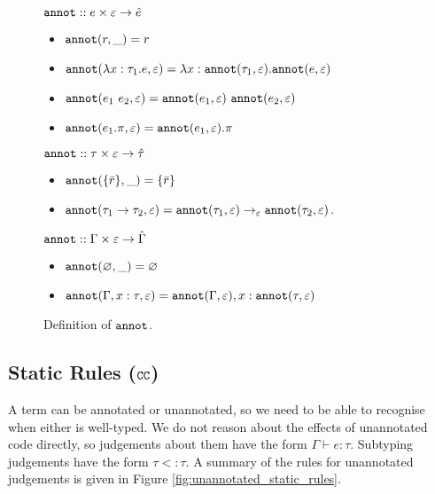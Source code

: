\begin{figure}
\vspace{-0.2cm}

$\mathtt{annot} :: e \times \varepsilon \rightarrow \hat e$

\begin{itemize}
	\setlength\itemsep{-0.2em}
	\item[] $\mathtt{annot}(r, \_) = r$
	\item[] $\mathtt{annot}(\lambda x: \tau_1 . e, \varepsilon) = \lambda x: \mathtt{annot}(\tau_1, \varepsilon) . \mathtt{annot}(e, \varepsilon)$
	\item[] $\mathtt{annot}(e_1~e_2, \varepsilon) = \mathtt{annot}(e_1, \varepsilon)~\mathtt{annot}(e_2, \varepsilon)$
	\item[] $\mathtt{annot}(e_1.\pi, \varepsilon) = \mathtt{annot}(e_1, \varepsilon).\pi$
\end{itemize}
	
$\mathtt{annot} :: \tau \times \varepsilon \rightarrow \hat \tau$

\begin{itemize}
	\setlength\itemsep{-0.2em}
	\item[] $\mathtt{annot}(\{ \bar r \}, \_) = \{ \bar r \}$
	\item[] $\mathtt{annot}(\tau_1 \rightarrow \tau_2, \varepsilon) = \mathtt{annot}(\tau_1, \varepsilon) \rightarrow_{\varepsilon} \mathtt{annot}(\tau_2, \varepsilon)$.	
\end{itemize}

$\mathtt{annot} :: \Gamma \times \varepsilon \rightarrow \hat \Gamma$

\begin{itemize}
	\setlength\itemsep{-0.2em}
	\item[] $\mathtt{annot}(\varnothing, \_) = \varnothing$
	\item[] $\mathtt{annot}(\Gamma, x: \tau, \varepsilon) = \mathtt{annot}(\Gamma, \varepsilon), x: \mathtt{annot}(\tau, \varepsilon)$
\end{itemize}
\vspace{-0.5cm}
\caption{Definition of $\mathtt{annot}$.}
\vspace{-0.5cm}
\label{fig:annot_defn}
\end{figure}

\subsection{Static Rules ($\mathtt{CC}$)}

A term can be annotated or unannotated, so we need to be able to
recognise when either is well-typed. We do not reason about the
effects of unannotated code directly, so judgements about them have
the form $\Gamma \vdash e: \tau$. Subtyping judgements have the form
$\tau <: \tau$. A summary of the rules for unannotated judgements is
given in Figure \ref{fig:unannotated_static_rules}.

